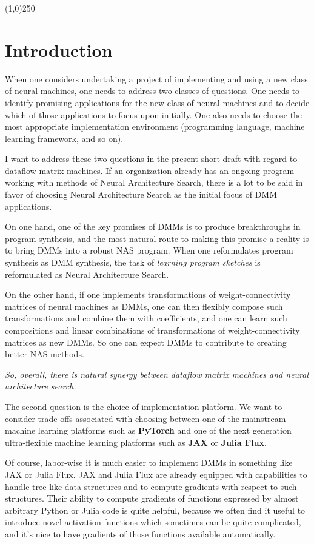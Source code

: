 \documentclass{article}
\begin{document}
\begin{center}
\line(1,0){250}
\end{center}

\section{Introduction}

When one considers undertaking a project of implementing and using a new class of neural machines,
one needs to address two classes of questions. One needs to identify promising applications for the new
class of neural machines and to decide which of those applications to focus upon initially.
One also needs to choose the most appropriate implementation environment (programming language,
machine learning framework, and so on).

I want to address these two questions in the present short draft with regard to dataflow matrix machines. 
If an organization already has an ongoing program working with methods of Neural Architecture Search,
there is a lot to be said in favor of choosing Neural Architecture Search as the initial focus of DMM
applications. 

On one hand, one of the key promises of DMMs is to produce breakthroughs in program
synthesis, and the most natural route to making this promise a reality is to bring DMMs into
a robust NAS program. When one reformulates program synthesis as DMM synthesis, the task of
{\em learning program sketches} is reformulated as Neural Architecture Search.

On the other hand, if one implements transformations of weight-connectivity
matrices of neural machines as DMMs, one can then flexibly compose such transformations and
combine them with coefficients, and one can learn such compositions and linear combinations
of transformations of weight-connectivity matrices as new DMMs. So one can expect DMMs to
contribute to creating better NAS methods.

{\em So, overall, there is natural synergy between dataflow matrix machines and neural architecture search.}

The second question is the choice of implementation platform. We want to consider trade-offs
associated with choosing between one of the mainstream machine learning platforms such as {\bf PyTorch} and
one of the next generation ultra-flexible machine learning platforms such as {\bf JAX} or {\bf Julia Flux}. 

Of course, labor-wise it is much easier to implement DMMs in something like JAX or Julia Flux. 
JAX and Julia Flux are already equipped with capabilities to handle tree-like data structures and
to compute gradients with respect to such structures. Their ability to compute gradients of functions
expressed by almost arbitrary Python or Julia code is quite helpful, because we often find it useful to introduce
novel activation functions which sometimes can be quite complicated, and it's nice to have
gradients of those functions available automatically. 
\end{document}
